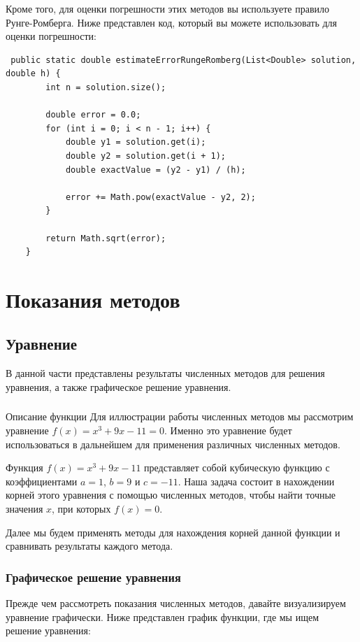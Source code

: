 \documentclass[12pt]{article}
\begin{document}
    Кроме того, для оценки погрешности этих методов вы используете правило Рунге-Ромберга. Ниже представлен код, который вы можете использовать для оценки погрешности:

    \begin{verbatim}
 public static double estimateErrorRungeRomberg(List<Double> solution, double h) {
        int n = solution.size();

        double error = 0.0;
        for (int i = 0; i < n - 1; i++) {
            double y1 = solution.get(i);
            double y2 = solution.get(i + 1);
            double exactValue = (y2 - y1) / (h);

            error += Math.pow(exactValue - y2, 2);
        }

        return Math.sqrt(error);
    }
    \end{verbatim}

\section{Показания методов}

\subsection{Уравнение}
В данной части представлены результаты численных методов для решения уравнения, а также графическое решение уравнения.

\subsubsection{}{Описание функции}
Для иллюстрации работы численных методов мы рассмотрим уравнение $f(x) = x^3 + 9x - 11 = 0$. Именно это уравнение будет использоваться в дальнейшем для применения различных численных методов.

Функция $f(x) = x^3 + 9x - 11$ представляет собой кубическую функцию с коэффициентами $a = 1$, $b = 9$ и $c = -11$. Наша задача состоит в нахождении корней этого уравнения с помощью численных методов, чтобы найти точные значения $x$, при которых $f(x) = 0$.

Далее мы будем применять методы для нахождения корней данной функции и сравнивать результаты каждого метода.


\subsubsection{Графическое решение уравнения}
Прежде чем рассмотреть показания численных методов, давайте визуализируем уравнение графически. Ниже представлен график функции, где мы ищем решение уравнения:
\end{document}
